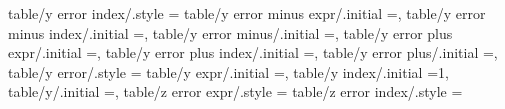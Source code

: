 {{{{{{{{{{{{{{{{{{{{{{{{{{{{{{{{{{{{{{{{{{{{{{{{{{{{{{{{table/y error index/.style                                         ={                                                                                                                                  
table/y error minus expr/.initial                                  =,                                                                                                                                  
table/y error minus index/.initial                                 =,                                                                                                                                  
table/y error minus/.initial                                       =,                                                                                                                                  
table/y error plus expr/.initial                                   =,                                                                                                                                  
table/y error plus index/.initial                                  =,                                                                                                                                  
table/y error plus/.initial                                        =,                                                                                                                                  
table/y error/.style                                               ={                                                                                                                                  
table/y expr/.initial                                              =,                                                                                                                                  
table/y index/.initial                                             =1,                                                                                                                                 
table/y/.initial                                                   =,                                                                                                                                  
table/z error expr/.style                                          ={                                                                                                                                  
table/z error index/.style                                         ={                                                                                                                                  
}}}}}}}}}}}}}}}}}}}}}}}}}}}}}}}}}}}}}}}}}}}}}}}}}}}}}}}}}}}}
